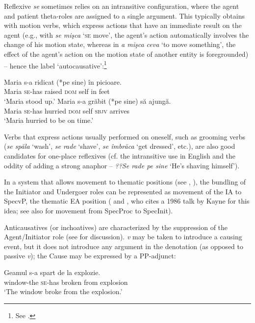 \documentclass[output=paper]{langsci/langscibook}
\begin{document}
Reflexive \textit{se} sometimes relies on an intransitive configuration, where the agent and patient theta-roles are assigned to a single argument. This typically obtains with motion verbs, which express actions that have an immediate result on the agent (e.g., with \textit{se mişca} ‘\textsc{se} move’, the agent’s action automatically involves the change of his motion state, whereas in \textit{a mişca ceva} ‘to move something’, the effect of the agent’s action on the motion state of another entity is foregrounded) – hence the label ‘autocausative’:\footnote{See \citealt{Geniušienė1987}.} 

\ea%
    \label{ex:giurgea:56}
    \ea
    \gll Maria s-a      ridicat (*pe     sine) în picioare.\\
          Maria \textsc{se-}has raised     \textsc{dom} self   in feet\\
    \glt ‘Maria stood up.’
    \ex
    \gll Maria s-a        grăbit   (*pe     sine)   să     ajungă.\\
          Maria \textsc{se-}has  hurried    \textsc{dom}  self    \textsc{sbjv} arrives \\
    \glt ‘Maria hurried to be on time.’ 
\z
\z

Verbs that express actions usually performed on oneself, such as grooming verbs (\textit{se spăla} ‘wash’, \textit{se rade} ‘shave’, \textit{se îmbrăca} ‘get dressed’, etc.), are also good candidates for one-place reflexives (cf. the intransitive use in English and the oddity of adding a strong anaphor – \textit{??Se rade pe sine} ‘He’s shaving himself’).

In a system that allows movement to thematic positions (see \citealt{Hornstein1999}, \citealt{Ramchand2008}), the bundling of the Initiator and Undergoer roles can be represented as movement of the IA to SpecvP, the thematic EA position (\citealt{Alboiu2004} and \citealt{Medová2009}, who cites a 1986 talk by Kayne for this idea; see also \citealt{Ramchand2008} for movement from SpecProc to SpecInit).

Anticausatives (or inchoatives) are characterized by the suppression of the Agent/Initiator role (see \citealt{Schäfer2008} for discussion). \textit{v} may be taken to introduce a causing event, but it does not introduce any argument in the denotation (as opposed to passive \textit{v}); the Cause may be expressed by a PP-adjunct: 

\ea%
    \label{ex:giurgea:57}
    \gll Geamul        s-a      spart    de la  explozie.\\
         window-the \textsc{se-}has broken from explosion\\
    \glt ‘The window broke from the explosion.’
    \z
\end{document}

